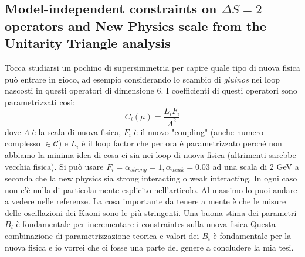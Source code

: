 \documentclass[12pt,a4paper,openright]{article}
\newcommand{\colg}{\textcolor{PineGreen}}
\newcommand{\colr}{\textcolor{BrickRed}}
\begin{document}
\subsection{Model-independent constraints on $\Delta S = 2$ operators and New Physics scale from the Unitarity Triangle analysis}
Tocca studiarsi un pochino di supersimmetria per capire quale tipo di nuova fisica può entrare in gioco, ad esempio considerando lo scambio di \textit{gluinos} nei loop nascosti in questi operatori di dimensione 6.
I coefficienti di questi operatori sono parametrizzati così:
\begin{equation*}
  C_i(\mu) = \frac{L_i F_i}{\Lambda^2}
\end{equation*}
dove $\Lambda$ è la scala di nuova fisica, $F_i$ è il nuovo "coupling" (anche numero complesso $\in \mathcal{C}$) e $L_i$ è il loop factor che per ora è parametrizzato perché non abbiamo la minima idea di cosa ci sia nei loop di nuova fisica (altrimenti sarebbe vecchia fisica).
Si può usare $F_i = \alpha_{strong} = 1, \alpha_{weak} = 0.03$ ad una scala di $2$ GeV a seconda che la new physics sia strong interacting o weak interacting.
\newline
In ogni caso non c'è nulla di particolarmente esplicito nell'articolo. Al massimo lo puoi andare a vedere nelle referenze.
La cosa importante da tenere a mente è che \colg{le misure delle oscillazioni dei Kaoni sono le più stringenti.
Una buona stima dei parametri $B_i$ è fondamentale per incrementare i constraintes sulla nuova fisica}
\colr{Questa combinazione di parametrizzazione teorica e valori dei $B_i$ è fondamentale per la nuova fisica e io vorrei che ci fosse una parte del genere a concludere la mia tesi}. 
\end{document}
